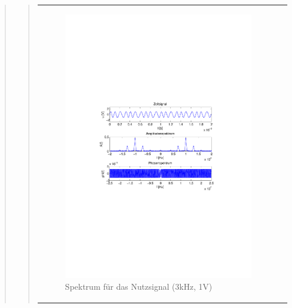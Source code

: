 \begin{quote}
\begin{quote}
\begin{center}
\begin{tabular}{ll}
\begin{minipage}{0.6\textwidth}
                    \begin{figure}[H]
                        \includegraphics[scale=0.5, trim = 4cm 9.5cm 3.5cm
                        9.5cm, clip]{./Bilder/spektrum_sin3kHz}
               
                        \caption{Spektrum für das Nutzsignal (3kHz, 1V)}
                    \end{figure}

                \end{minipage}
                \begin{minipage}{0.6\textwidth}


\end{minipage}
\end{tabular}
\end{center}
\end{quote}
\end{quote}
